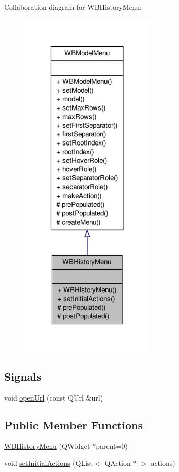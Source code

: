 Collaboration diagram for W\-B\-History\-Menu\-:
\nopagebreak
\begin{figure}[H]
\begin{center}
\leavevmode
\includegraphics[width=186pt]{df/d6a/class_w_b_history_menu__coll__graph}
\end{center}
\end{figure}
\subsection*{Signals}
\begin{DoxyCompactItemize}
\item 
void \hyperlink{class_w_b_history_menu_a7b1e977545e4afd1ef3a439b99009328}{open\-Url} (const Q\-Url \&url)
\end{DoxyCompactItemize}
\subsection*{Public Member Functions}
\begin{DoxyCompactItemize}
\item 
\hyperlink{class_w_b_history_menu_accfbbf7c647683870ae37fd77c69bc9d}{W\-B\-History\-Menu} (Q\-Widget $\ast$parent=0)
\item 
void \hyperlink{class_w_b_history_menu_ad9c7cc40007b43f98afec4a1717d1ea7}{set\-Initial\-Actions} (Q\-List$<$ Q\-Action $\ast$ $>$ actions)
\end{DoxyCompactItemize}
